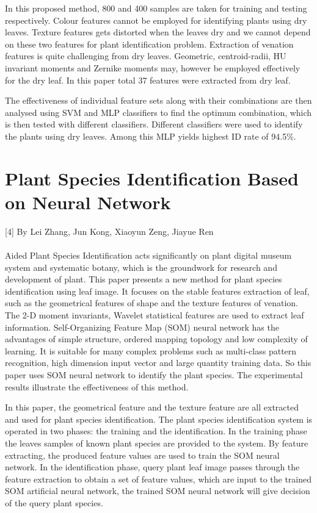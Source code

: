 In this proposed method, 800 and 400 samples are taken
for training and testing respectively. Colour features cannot
be employed for identifying plants using dry leaves. Texture
features gets distorted when the leaves dry and we cannot
depend on these two features for plant identification problem.
Extraction of venation features is quite challenging from dry
leaves. Geometric, centroid-radii, HU invariant moments and
Zernike moments may, however be employed effectively for
the dry leaf. In this paper total 37 features were extracted from
dry leaf.

The effectiveness of individual feature sets along with their
combinations are then analysed using SVM and MLP classifiers to find the optimum combination, which is then tested
with different classifiers. Different classifiers were used to
identify the plants using dry leaves. Among this MLP yields
highest ID rate of 94.5\%.

\section{Plant Species Identification Based on Neural Network}
[4] By Lei Zhang, Jun Kong, Xiaoyun Zeng, Jiayue Ren
\paragraph{}
Aided Plant Species Identification acts
significantly on plant digital museum system and
systematic botany, which is the groundwork for research
and development of plant. This paper presents a new
method for plant species identification using leaf image. It
focuses on the stable features extraction of leaf, such as
the geometrical features of shape and the texture features
of venation. The 2-D moment invariants, Wavelet
statistical features are used to extract leaf information.
Self-Organizing Feature Map (SOM) neural network has
the advantages of simple structure, ordered mapping
topology and low complexity of learning. It is suitable for
many complex problems such as multi-class pattern
recognition, high dimension input vector and large
quantity training data. So this paper uses SOM neural
network to identify the plant species. The experimental
results illustrate the effectiveness of this method.

In this paper, the geometrical feature
and the texture feature are all extracted and used for plant
species identification.
The plant species identification system is operated in
two phases: the training and the
identification. In the training phase the leaves samples of
known plant species are provided to the system. By
feature extracting, the produced feature values are used to
train the SOM neural network. In the identification phase,
query plant leaf image passes through the feature
extraction to obtain a set of feature values, which are
input to the trained SOM artificial neural network, the
trained SOM neural network will give decision of the
query plant species.\\

